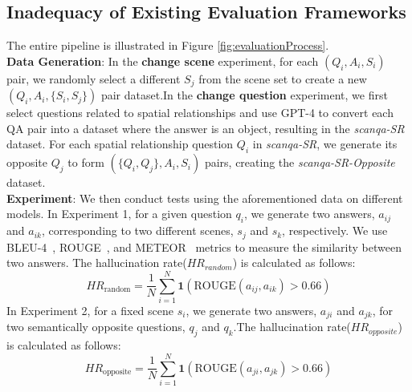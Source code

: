 \subsection{ Inadequacy of Existing Evaluation Frameworks}
The entire pipeline is illustrated in Figure \ref{fig:evaluationProcess}. \\
\textbf{Data Generation}: In the \textbf{change scene} experiment, for each $(Q_i,A_i,S_i)$ pair, we randomly select a different $S_j$ from the scene set to create a new $(Q_i,A_i,\{S_i, S_j\})$ pair dataset.In the \textbf{change question} experiment, we first select questions related to spatial relationships and use GPT-4 to convert each QA pair into a dataset where the answer is an object, resulting in the \textit{scanqa-SR} dataset. For each spatial relationship question $Q_i$ in \textit{scanqa-SR}, we generate its opposite $Q_j$ to form $(\{Q_i, Q_j\},A_i,S_i)$ pairs, creating the \textit{scanqa-SR-Opposite} dataset.\\
\textbf{Experiment}: We then conduct tests using the aforementioned data on different models. 
In Experiment 1, for a given question \( q_i \), we generate two answers, \( a_{ij} \) and \( a_{ik} \), corresponding to two different scenes, \( s_{j} \) and \( s_{k} \), respectively.
We use BLEU-4~\cite{papineni2002bleu}, ROUGE~\cite{lin-2004-rouge}, and METEOR~\cite{banerjee2005meteor} metrics to measure the similarity between two answers. The hallucination rate($HR_{random}$) is calculated as follows:
\begin{equation}
HR_{\text{random}} = \frac{1}{N} \sum_{i=1}^{N} \mathbf{1}(\text{ROUGE}(a_{ij}, a_{ik}) > 0.66)
\end{equation}
In Experiment 2, for a fixed scene \( s_i \), we generate two answers, \( a_{ji} \) and \( a_{jk} \), for two semantically opposite questions, \( q_j \) and \( q_k \).The hallucination rate($HR_{opposite}$) is calculated as follows:
\begin{equation}
HR_{\text{opposite}} = \frac{1}{N} \sum_{i=1}^{N} \mathbf{1}(\text{ROUGE}(a_{ji}, a_{jk}) > 0.66)
\end{equation}

